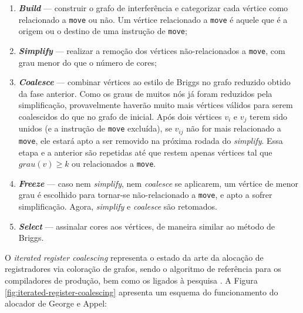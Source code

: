 \documentclass[
	12pt,				%
	openright,			%
	twoside,			%
	a4paper,			%
	tcc,			%
	]{ABNT-DC-UEL}
\begin{document}
\begin{enumerate}
    \item \textit{\textbf{Build}} --- construir o grafo de interferência e categorizar cada vértice como relacionado a \texttt{move} ou não. Um vértice relacionado a \texttt{move} é aquele que é a origem ou o destino de uma instrução de \texttt{move};
    \item \textit{\textbf{Simplify}} --- realizar a remoção dos vértices não-relacionados a \texttt{move}, com grau menor do que o número de cores;
    \item \textit{\textbf{Coalesce}} --- combinar vértices ao estilo de Briggs no grafo reduzido obtido da fase anterior. Como os graus de muitos nós já foram reduzidos pela simplificação, provavelmente haverão muito mais vértices válidos para serem coalescidos do que no grafo de inicial. Após dois vértices $v_i$ e $v_j$ terem sido unidos (e a instrução de \texttt{move} excluída), se $v_{ij}$ não for mais relacionado a \texttt{move}, ele estará apto a ser removido na próxima rodada do \textit{simplify}. Essa etapa e a anterior são repetidas até que restem apenas vértices tal que $grau(v)\geq k$ ou relacionados a \texttt{move}.
    \item \textit{\textbf{Freeze}} --- caso nem \textit{simplify}, nem \textit{coalesce} se aplicarem, um vértice de menor grau é escolhido para tornar-se não-relacionado a \texttt{move}, e apto a sofrer simplificação. Agora, \textit{simplify} e \textit{coalesce} são retomados.
    \item \textit{\textbf{Select}} --- assinalar cores aos vértices, de maneira similar ao método de Briggs.
\end{enumerate}

O \textit{iterated register coalescing} representa o estado da arte da alocação de registradores via coloração de grafos, sendo o algoritmo de referência para os compiladores de produção, bem como os ligados à pesquisa \cite{protzenko:09}. A Figura \ref{fig:iterated-register-coalescing} apresenta um esquema do funcionamento do alocador de George e Appel:
\end{document}
